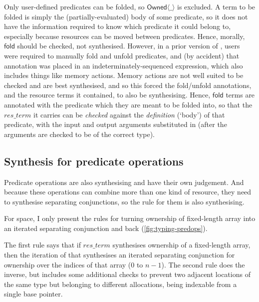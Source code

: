 Only user-defined predicates can be folded, so $\mathsf{Owned}\langle\_\rangle$
is excluded. A term to
be folded is simply the (partially-evaluated) body of some predicate, so it
does not have the information required to know which predicate it could belong
to, especially because resources can be moved between predicates. Hence,
morally, $\mathsf{fold}$ should be checked, not synthesised. However, in a
prior version of , users were required to manually fold and unfold
predicates, and (by accident) that annotation was placed in an
indeterminately-sequenced expression, which also includes things like memory
actions. Memory actions are not well suited to be checked and are best
synthesised, and so this forced the fold/unfold annotations, and the resource
terms it contained, to also be synthesising. Hence, $\mathsf{fold}$ terms are annotated with the predicate which
they are meant to be folded into, so that the $\mathit{res\_term}$ it carries
can be \emph{checked} against the \emph{definition} (`body') of that predicate,
with the input and output arguments substituted in (after the arguments
are checked to be of the correct type).

\subsection{Synthesis for predicate operations}

Predicate operations are also synthesising and have their own judgement. And
because these operations can combine more than one kind of resource, they need
to synthesise separating conjunctions, so the rule for them is also
synthesising.

For space, I only present the rules for turning ownership of fixed-length array
into an iterated separating conjunction and back (\cref{fig:typing-predops}).

The first rule says that if $\mathit{res\_term}$ synthesises ownership of a
fixed-length array, then the iteration of that synthesises an iterated separating
conjunction for ownership over the indices of that array ($0$ to
$n-1$). The second rule does the
inverse, but includes some additional checks to prevent two adjacent locations
of the same type but belonging to different allocations, being indexable from
a single base pointer.

